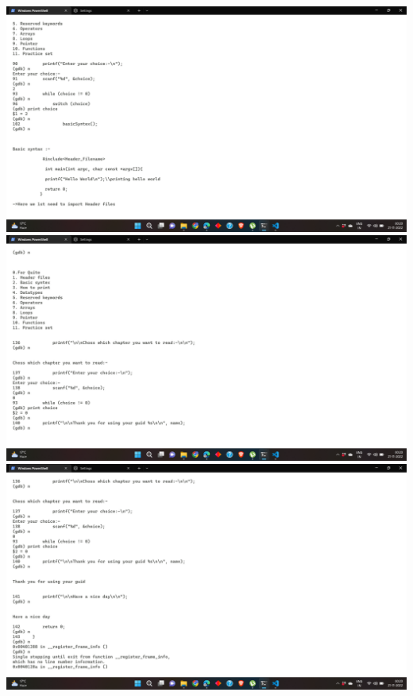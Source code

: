 \documentclass{article}
\begin{document}
\includegraphics[width=\linewidth]{pic4.png}\\
\includegraphics[width=\linewidth]{pic5.png}\\
\includegraphics[width=\linewidth]{pic6.png}\\
\end{document}
